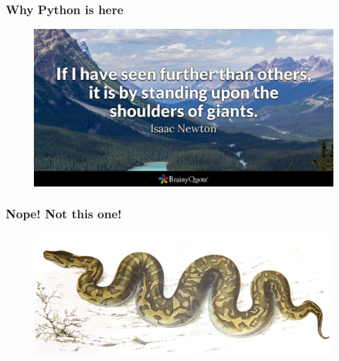 \begin{frame}[fragile]
\frametitle{Why Python is here}
\begin{figure}
\includegraphics[width=0.8\linewidth]{isaacnewton1-2x}
\end{figure}
\end{frame}


\begin{frame}[fragile]
\frametitle{Nope! Not this one!}
\begin{figure}
\includegraphics[width=0.8\linewidth]{Python-snake}
\end{figure}
\end{frame}
